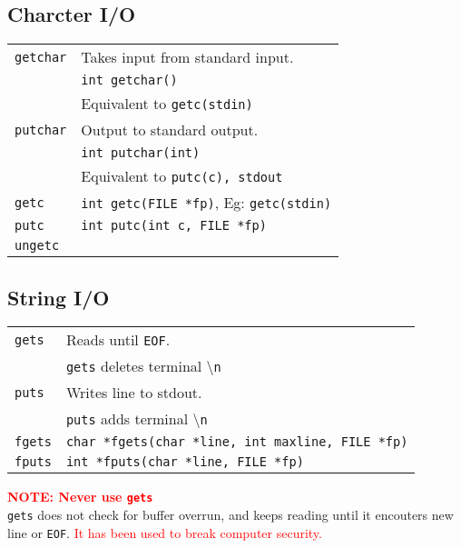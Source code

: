 \begin{multicols*}{3}
\subsection{Charcter I/O}
\begin{tabularx}{\linewidth}{lX}
\texttt{getchar} & Takes input from standard input.\\
& \texttt{int getchar()}\\
& Equivalent to \texttt{getc(stdin)}\\
\texttt{putchar} & Output to standard output.\\
& \texttt{int putchar(int)}\\
& Equivalent to \texttt{putc(c), stdout}\\
\texttt{getc} & \texttt{int getc(FILE *fp)}, Eg: \texttt{getc(stdin)}\\
\texttt{putc} & \texttt{int putc(int c, FILE *fp)}\\
\texttt{ungetc} & \\
\end{tabularx}

\subsection{String I/O}
\begin{tabularx}{\linewidth}{lX}
\texttt{gets} & Reads until \texttt{EOF}.\\
& \texttt{gets} deletes terminal \textbackslash \texttt{n}\\
\texttt{puts} & Writes line to stdout.\\
& \texttt{puts} adds terminal \textbackslash \texttt{n}\\
\texttt{fgets} & \texttt{char *fgets(char *line, int maxline, FILE *fp)}\\
\texttt{fputs} & \texttt{int *fputs(char *line, FILE *fp)}\\
\end{tabularx}

\begin{mdframed}
\textbf{\textcolor{red}{NOTE: Never use \texttt{gets}}}\\
\texttt{gets} does not check for buffer overrun, and keeps reading until it encouters new line or \texttt{EOF}.
\textcolor{red}{It has been used to break computer security.}
\end{mdframed}

\vfill \null


\end{multicols*}
